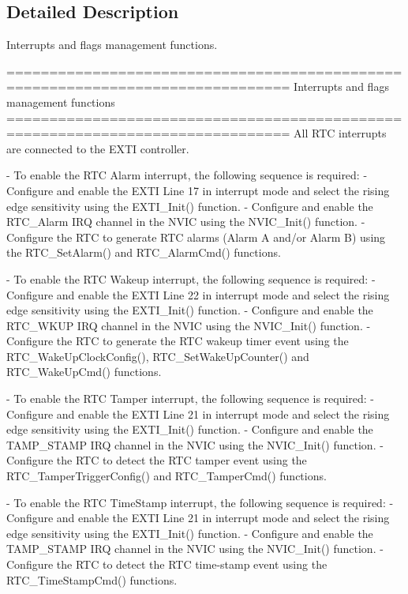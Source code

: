 \subsection{Detailed Description}
Interrupts and flags management functions. 

\begin{DoxyVerb} ===============================================================================
                       Interrupts and flags management functions
 ===============================================================================  
 All RTC interrupts are connected to the EXTI controller.
 
 - To enable the RTC Alarm interrupt, the following sequence is required:
   - Configure and enable the EXTI Line 17 in interrupt mode and select the rising 
     edge sensitivity using the EXTI_Init() function.
   - Configure and enable the RTC_Alarm IRQ channel in the NVIC using the NVIC_Init()
     function.
   - Configure the RTC to generate RTC alarms (Alarm A and/or Alarm B) using
     the RTC_SetAlarm() and RTC_AlarmCmd() functions.

 - To enable the RTC Wakeup interrupt, the following sequence is required:
   - Configure and enable the EXTI Line 22 in interrupt mode and select the rising 
     edge sensitivity using the EXTI_Init() function.
   - Configure and enable the RTC_WKUP IRQ channel in the NVIC using the NVIC_Init()
     function.
   - Configure the RTC to generate the RTC wakeup timer event using the 
     RTC_WakeUpClockConfig(), RTC_SetWakeUpCounter() and RTC_WakeUpCmd() functions.

 - To enable the RTC Tamper interrupt, the following sequence is required:
   - Configure and enable the EXTI Line 21 in interrupt mode and select the rising 
     edge sensitivity using the EXTI_Init() function.
   - Configure and enable the TAMP_STAMP IRQ channel in the NVIC using the NVIC_Init()
     function.
   - Configure the RTC to detect the RTC tamper event using the 
     RTC_TamperTriggerConfig() and RTC_TamperCmd() functions.

 - To enable the RTC TimeStamp interrupt, the following sequence is required:
   - Configure and enable the EXTI Line 21 in interrupt mode and select the rising 
     edge sensitivity using the EXTI_Init() function.
   - Configure and enable the TAMP_STAMP IRQ channel in the NVIC using the NVIC_Init()
     function.
   - Configure the RTC to detect the RTC time-stamp event using the 
     RTC_TimeStampCmd() functions.\end{DoxyVerb}
 

